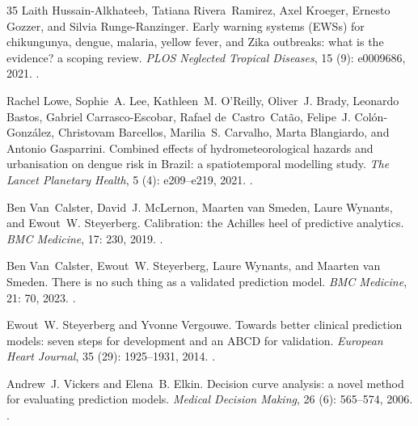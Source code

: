 \documentclass[11pt,a4paper]{article}
\begin{document}
\begin{thebibliography}{35}
Laith Hussain-Alkhateeb, Tatiana Rivera~Ramirez, Axel Kroeger, Ernesto Gozzer,
  and Silvia Runge-Ranzinger.
\newblock Early warning systems ({EWSs}) for chikungunya, dengue, malaria,
  yellow fever, and {Zika} outbreaks: what is the evidence? a scoping review.
\newblock \emph{PLOS Neglected Tropical Diseases}, 15 (9):
  e0009686, 2021.
\newblock {}.

Rachel Lowe, Sophie~A. Lee, Kathleen~M. O'Reilly, Oliver~J. Brady, Leonardo
  Bastos, Gabriel Carrasco-Escobar, Rafael de~Castro~Cat{\~a}o, Felipe~J.
  Col{\'o}n-Gonz{\'a}lez, Christovam Barcellos, Marilia~S. Carvalho, Marta
  Blangiardo, and Antonio Gasparrini.
\newblock Combined effects of hydrometeorological hazards and urbanisation on
  dengue risk in {Brazil}: a spatiotemporal modelling study.
\newblock \emph{The Lancet Planetary Health}, 5 (4):
  e209--e219, 2021.
\newblock {}.

Ben Van~Calster, David~J. McLernon, Maarten van Smeden, Laure Wynants, and
  Ewout~W. Steyerberg.
\newblock Calibration: the {Achilles} heel of predictive analytics.
\newblock \emph{BMC Medicine}, 17: 230, 2019.
\newblock {}.

Ben Van~Calster, Ewout~W. Steyerberg, Laure Wynants, and Maarten van Smeden.
\newblock There is no such thing as a validated prediction model.
\newblock \emph{BMC Medicine}, 21: 70, 2023.
\newblock {}.

Ewout~W. Steyerberg and Yvonne Vergouwe.
\newblock Towards better clinical prediction models: seven steps for
  development and an {ABCD} for validation.
\newblock \emph{European Heart Journal}, 35 (29): 1925--1931,
  2014.
\newblock {}.

Andrew~J. Vickers and Elena~B. Elkin.
\newblock Decision curve analysis: a novel method for evaluating prediction
  models.
\newblock \emph{Medical Decision Making}, 26 (6): 565--574,
  2006.
\newblock {}.


\end{thebibliography}
\end{document}
